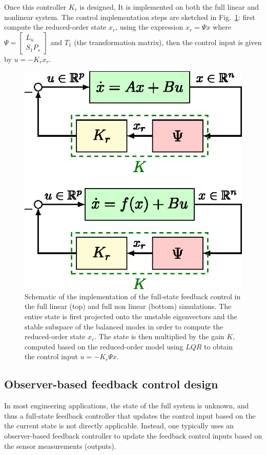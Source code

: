 \documentclass[12pt,lot, lof]{puthesis}
\begin{document}
Once this controller $K_r$ is designed, It is implemented on both the full linear and nonlinear system. The control implementation steps are sketched in Fig.~\ref{lqr_sketch}: first compute the reduced-order state $x_r$, using the expression $x_r = \Psi x$ where $\Psi =  \begin{bmatrix}L_u\\ S_1 P_s \end{bmatrix}$ and $T_1$ (the transformation matrix), then the control input is given by $u = - K_r x_r$.
\begin{figure}[htb]
\centering
  \includegraphics[width=0.6 \linewidth]{lqr_sketch}
\caption{Schematic of the implementation of the full-state feedback control in the full linear (top) and full non linear (bottom) simulations. The entire state is first projected onto the unstable eigenvectors and the stable subspace of the balanced modes in order to compute the reduced-order state $x_r$. The state is then multiplied by the gain $K$, computed based on the reduced-order model using $LQR$ to obtain the control input $u = - K_r   \Psi x $.}
\label{lqr_sketch}
\end{figure}


\subsection{Observer-based feedback control design}

In most engineering applications, the state of the full system is unknown, and thus a full-state feedback controller that updates the control input based on the the current state is not directly applicable. Instead, one typically uses an observer-based feedback controller to update the feedback control inputs based on the sensor measurements (outputs).
\end{document}
